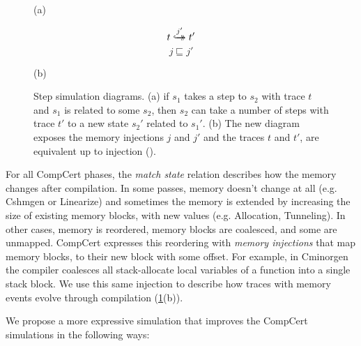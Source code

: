 \begin{figure}\centering
\begin{multicols}{2}

\



\

(a)
\begin{multicols}{2}

$$t \overset{j'}{\hookrightarrow\mathrel{\mspace{-15mu}}\rightarrow} t'$$
$$j \sqsubseteq j'$$
\end{multicols}

(b)
\end{multicols}
\caption[Step simulation diagrams]{Step simulation diagrams. (a) if $s_1$ takes a step to $s_2$ with trace $t$ and $s_1$ is related to some $s_2$, then $s_2$ can take a number of steps with trace $t'$ to a new state $s_2'$ related to $s_1'$. (b) The new diagram exposes the memory injections $j$ and $j'$ and the traces $t$ and $t'$, are equivalent up to injection
().}\label{table:step_sim}
\end{figure}
For all CompCert phases, the \emph{match state} relation describes how the memory changes after compilation. In some passes, memory doesn't change at all (e.g. Cshmgen or Linearize) and sometimes the memory is extended by increasing the size of existing memory blocks, with new values (e.g. Allocation, Tunneling). In other cases, memory is reordered, memory blocks are coalesced, and some are unmapped. CompCert expresses this reordering with \emph{memory injections} that map memory blocks, to their new block with some offset. For example, in Cminorgen the compiler coalesces all stack-allocate local variables of a function into a single stack block. We use this same injection to describe how traces with memory events evolve through compilation (\cref{table:step_sim}(b)).

We propose a more expressive simulation  that improves the CompCert simulations in the following ways:

